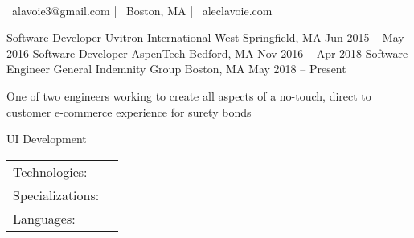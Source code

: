 \documentclass[]{awesome-cv}
\begin{document}
    
\begin{center}
	  \\
	\vspace{2mm}
	{\faEnvelope\ alavoie3@gmail.com} | {\faMapMarker\ Boston, MA} | {\faLink\ aleclavoie.com}
\end{center}
\begin{cventries}
	\cventry
	{Software Developer}
	{Uvitron International}
	{West Springfield, MA}
	{Jun 2015 – May 2016}
	{}
	\cventry
	{Software Developer}
	{AspenTech}
	{Bedford, MA}
	{Nov 2016 – Apr 2018}
	{}
	\cventry
	{Software Engineer}
	{General Indemnity Group}
	{Boston, MA}
	{May 2018 – Present}
	{\begin{cvitems}
		\item {One of two engineers working to create all aspects of a no-touch, direct to customer e-commerce experience for surety bonds}
		\item {UI Development}
		\end{cvitems}}
\end{cventries}
\begin{cventries}
	\cventry
	{}
	{\def\arraystretch{1.15}{\begin{tabular}{ l l }
		Technologies:  & {\skill{ Gatsby, Webpack, d3.js, React, React Hooks, Ramda, GoJS, Cypress, Jest, Netlify, Contentful}} \\
		Specializations:  & {\skill{ Functional Programming, Accessibility, JAM Stack, Single Page/Hybrid Applications}} \\
		Languages:  & {\skill{ JavaScript, TypeScript, Node.js, C, Bash}} \\
		\end{tabular}}}
	{}
	{}
	{}
\end{cventries}
\end{document}
